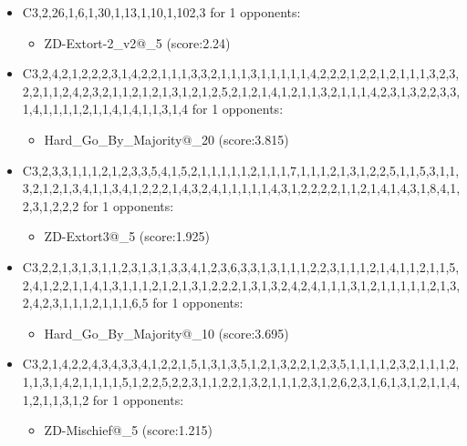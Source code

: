 \begin{appendices}
\begin{itemize}
        \item C3,2,26,1,6,1,30,1,13,1,10,1,102,3 for 1 opponents:
        \begin{multicols}{3}
            \begin{itemize}
                \item ZD-Extort-2\_v2@\_5 (score:2.24)
            \end{itemize}
        \end{multicols}

        \item C3,2,4,2,1,2,2,2,3,1,4,2,2,1,1,1,3,3,2,1,1,1,3,1,1,1,1,1,4,2,2,2,1,2,2,1,2,1,1,1,3,2,3,2,2,1,1,2,4,2,3,2,1,1,2,1,2,1,3,1,2,1,2,5,2,1,2,1,4,1,2,1,1,3,2,1,1,1,4,2,3,1,3,2,2,3,3,1,4,1,1,1,1,2,1,1,4,1,4,1,1,3,1,4 for 1 opponents:
        \begin{multicols}{3}
            \begin{itemize}
                \item Hard\_Go\_By\_Majority@\_20 (score:3.815)
            \end{itemize}
        \end{multicols}

        \item C3,2,3,3,1,1,1,2,1,2,3,3,5,4,1,5,2,1,1,1,1,1,2,1,1,1,7,1,1,1,2,1,3,1,2,2,5,1,1,5,3,1,1,3,2,1,2,1,3,4,1,1,3,4,1,2,2,2,1,4,3,2,4,1,1,1,1,1,4,3,1,2,2,2,2,1,1,2,1,4,1,4,3,1,8,4,1,2,3,1,2,2,2 for 1 opponents:
        \begin{multicols}{3}
            \begin{itemize}
                \item ZD-Extort3@\_5 (score:1.925)
            \end{itemize}
        \end{multicols}

        \item C3,2,2,1,3,1,3,1,1,2,3,1,3,1,3,3,4,1,2,3,6,3,3,1,3,1,1,1,2,2,3,1,1,1,2,1,4,1,1,2,1,1,5,2,4,1,2,2,1,1,4,1,3,1,1,1,2,1,2,1,3,1,2,2,2,1,3,1,3,2,4,2,4,1,1,1,3,1,2,1,1,1,1,1,2,1,3,2,4,2,3,1,1,1,2,1,1,1,6,5 for 1 opponents:
        \begin{multicols}{3}
            \begin{itemize}
                \item Hard\_Go\_By\_Majority@\_10 (score:3.695)
            \end{itemize}
        \end{multicols}

        \item C3,2,1,4,2,2,4,3,4,3,3,4,1,2,2,1,5,1,3,1,3,5,1,2,1,3,2,2,1,2,3,5,1,1,1,1,2,3,2,1,1,1,2,1,1,3,1,4,2,1,1,1,1,5,1,2,2,5,2,2,3,1,1,2,2,1,3,2,1,1,1,2,3,1,2,6,2,3,1,6,1,3,1,2,1,1,4,1,2,1,1,3,1,2 for 1 opponents:
        \begin{multicols}{3}
            \begin{itemize}
                \item ZD-Mischief@\_5 (score:1.215)
            \end{itemize}
        \end{multicols}


\end{itemize}
\end{appendices}
